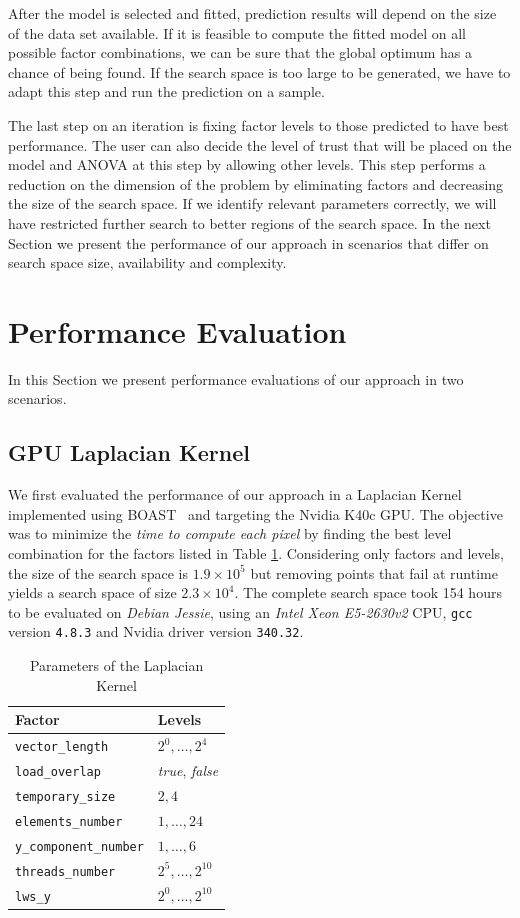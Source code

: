 \documentclass[conference]{IEEEtran}
\begin{document}
After the model is selected and fitted, prediction results will depend on the
size of the data set available. If it is feasible to compute the fitted model on
all possible factor combinations, we can be sure that the global optimum has a
chance of being found. If the search space is too large to be generated, we have
to adapt this step and run the prediction on a sample.

The last step on an iteration is fixing factor levels to those predicted to have
best performance. The user can also decide the level of trust that will be
placed on the model and ANOVA at this step by allowing other levels. This step
performs a reduction on the dimension of the problem by eliminating factors and
decreasing the size of the search space. If we identify relevant parameters
correctly, we will have restricted further search to better regions of the
search space. In the next Section we present the performance of our approach in
scenarios that differ on search space size, availability and complexity.
\section{Performance Evaluation}
\label{sec:org4580356}
In this Section we present performance evaluations of our approach in two
scenarios.
\subsection{GPU Laplacian Kernel}
\label{sec:org8fe306e}
We first evaluated the performance of our approach in a Laplacian Kernel
implemented using BOAST~\cite{videau2017boast} and targeting the Nvidia
K40c GPU. The objective was to minimize the \emph{time to compute each pixel} by
finding the best level combination for the factors listed in Table
\ref{tab:org266fcdd}. Considering only factors and levels, the size of the
search space is \(1.9\times10^5\) but removing points that fail at runtime yields
a search space of size \(2.3\times10^4\). The complete search space took 154 hours
to be evaluated on \emph{Debian Jessie}, using an \emph{Intel Xeon E5-2630v2} CPU,
\texttt{gcc} version \texttt{4.8.3} and Nvidia driver version \texttt{340.32}.

\begin{table}[ht]
\caption{\label{tab:org266fcdd}
Parameters of the Laplacian Kernel}
\centering
\footnotesize
\begin{tabular}{ll}
\toprule
Factor & Levels\\
\midrule
\texttt{vector\_length} & \(2^0,\dots,2^4\)\\
\texttt{load\_overlap} & \textit{true}, \textit{false}\\
\texttt{temporary\_size} & \(2,4\)\\
\texttt{elements\_number} & \(1,\dots,24\)\\
\texttt{y\_component\_number} & \(1,\dots,6\)\\
\texttt{threads\_number} & \(2^5,\dots,2^{10}\)\\
\texttt{lws\_y} & \(2^0,\dots,2^{10}\)\\
\bottomrule
\end{tabular}
\end{table}
\end{document}
